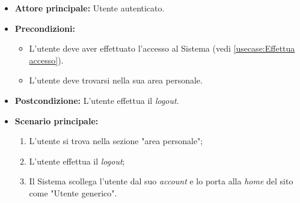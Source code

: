 \label{usecase:Logout}
\begin{itemize}
	\item \textbf{Attore principale:} Utente autenticato.

	\item \textbf{Precondizioni:}
	\begin{itemize}
        \item L'utente deve aver effettuato l'accesso al Sistema (vedi \autoref{usecase:Effettua accesso}).
        \item L'utente deve trovarsi nella sua area personale.
    \end{itemize}

	\item \textbf{Postcondizione:} L'utente effettua il \textit{logout}.

	\item \textbf{Scenario principale:}
	      \begin{enumerate}
		      \item L'utente si trova nella sezione "area personale";
		      \item L'utente effettua il \textit{logout};
              \item Il Sistema scollega l'utente dal suo \textit{account} e lo porta alla \textit{home} del sito come "Utente generico".
	      \end{enumerate}
\end{itemize}

